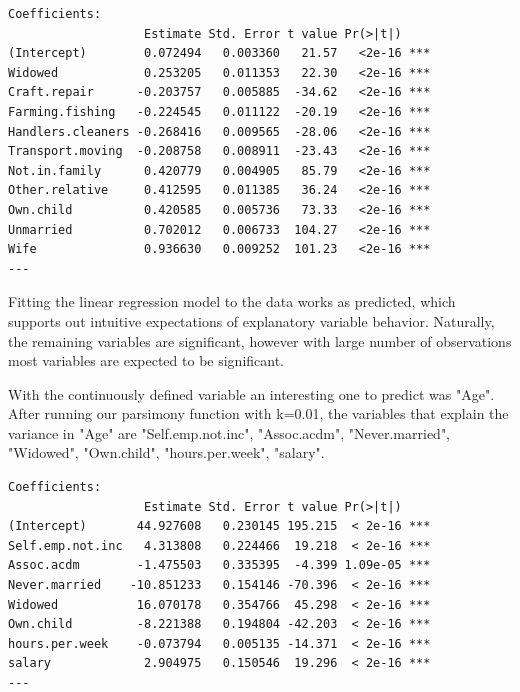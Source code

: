 \documentclass[letter]{article}
\begin{document}
\begin{verbatim}
Coefficients:
                   Estimate Std. Error t value Pr(>|t|)    
(Intercept)        0.072494   0.003360   21.57   <2e-16 ***
Widowed            0.253205   0.011353   22.30   <2e-16 ***
Craft.repair      -0.203757   0.005885  -34.62   <2e-16 ***
Farming.fishing   -0.224545   0.011122  -20.19   <2e-16 ***
Handlers.cleaners -0.268416   0.009565  -28.06   <2e-16 ***
Transport.moving  -0.208758   0.008911  -23.43   <2e-16 ***
Not.in.family      0.420779   0.004905   85.79   <2e-16 ***
Other.relative     0.412595   0.011385   36.24   <2e-16 ***
Own.child          0.420585   0.005736   73.33   <2e-16 ***
Unmarried          0.702012   0.006733  104.27   <2e-16 ***
Wife               0.936630   0.009252  101.23   <2e-16 ***
---

\end{verbatim}

Fitting the linear regression model to the data works as predicted, which supports out intuitive expectations of explanatory variable behavior. Naturally, the remaining variables are significant, however with large number of observations most variables are expected to be significant. 

With the continuously defined variable an interesting one to predict was "Age". After running our parsimony function with k=0.01, the variables that explain the variance in "Age" are "Self.emp.not.inc", "Assoc.acdm", "Never.married", "Widowed", "Own.child", "hours.per.week", "salary".   

\begin{verbatim}
Coefficients:
                   Estimate Std. Error t value Pr(>|t|)    
(Intercept)       44.927608   0.230145 195.215  < 2e-16 ***
Self.emp.not.inc   4.313808   0.224466  19.218  < 2e-16 ***
Assoc.acdm        -1.475503   0.335395  -4.399 1.09e-05 ***
Never.married    -10.851233   0.154146 -70.396  < 2e-16 ***
Widowed           16.070178   0.354766  45.298  < 2e-16 ***
Own.child         -8.221388   0.194804 -42.203  < 2e-16 ***
hours.per.week    -0.073794   0.005135 -14.371  < 2e-16 ***
salary             2.904975   0.150546  19.296  < 2e-16 ***
---
\end{verbatim}
\end{document}
